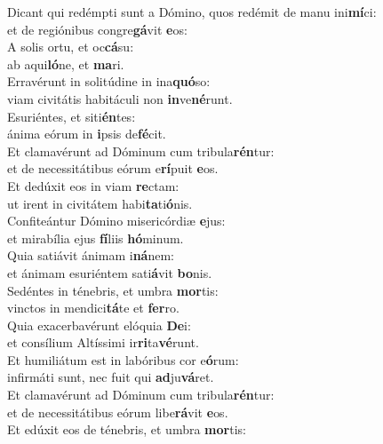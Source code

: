 \evenverse Dicant qui redémpti sunt a Dómino, quos redémit de manu ini\textbf{mí}ci:~\*\\
\evenverse et de regiónibus congre\textbf{gá}vit \textbf{e}os:\\
\oddverse A solis ortu, et oc\textbf{cá}su:~\*\\
\oddverse ab aqui\textbf{ló}ne, et \textbf{ma}ri.\\
\evenverse Erravérunt in solitúdine in ina\textbf{quó}so:~\*\\
\evenverse viam civitátis habitáculi non \textbf{in}ve\textbf{né}runt.\\
\oddverse Esuriéntes, et siti\textbf{én}tes:~\*\\
\oddverse ánima eórum in \textbf{i}psis de\textbf{fé}cit.\\
\evenverse Et clamavérunt ad Dóminum cum tribula\textbf{rén}tur:~\*\\
\evenverse et de necessitátibus eórum e\textbf{rí}puit \textbf{e}os.\\
\oddverse Et dedúxit eos in viam \textbf{re}ctam:~\*\\
\oddverse ut irent in civitátem habi\textbf{ta}ti\textbf{ó}nis.\\
\evenverse Confiteántur Dómino misericórdiæ \textbf{e}jus:~\*\\
\evenverse et mirabília ejus \textbf{fí}liis \textbf{hó}minum.\\
\oddverse Quia satiávit ánimam i\textbf{ná}nem:~\*\\
\oddverse et ánimam esuriéntem sati\textbf{á}vit \textbf{bo}nis.\\
\evenverse Sedéntes in ténebris, et umbra \textbf{mor}tis:~\*\\
\evenverse vinctos in mendici\textbf{tá}te et \textbf{fer}ro.\\
\oddverse Quia exacerbavérunt elóquia \textbf{De}i:~\*\\
\oddverse et consílium Altíssimi ir\textbf{ri}ta\textbf{vé}runt.\\
\evenverse Et humiliátum est in labóribus cor e\textbf{ó}rum:~\*\\
\evenverse infirmáti sunt, nec fuit qui \textbf{ad}ju\textbf{vá}ret.\\
\oddverse Et clamavérunt ad Dóminum cum tribula\textbf{rén}tur:~\*\\
\oddverse et de necessitátibus eórum libe\textbf{rá}vit \textbf{e}os.\\
\evenverse Et edúxit eos de ténebris, et umbra \textbf{mor}tis:~\*\\
